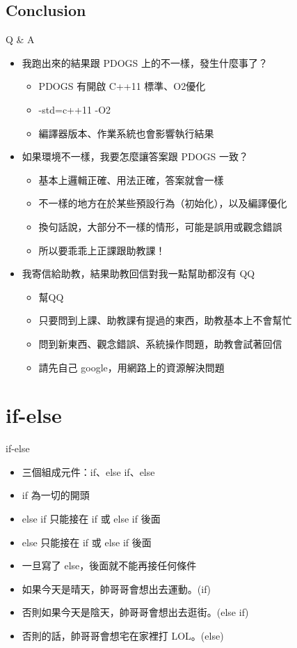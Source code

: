 \documentclass[t]{beamer}
\begin{document}
\subsection{Conclusion}
\begin{frame}{Q \& A}
  \begin{itemize}
    \item 我跑出來的結果跟 PDOGS 上的不一樣，發生什麼事了？
      \begin{itemize}
        \item PDOGS 有開啟 C++11 標準、O2優化
        \item -std=c++11 -O2
        \item 編譯器版本、作業系統也會影響執行結果
      \end{itemize}
    \item 如果環境不一樣，我要怎麼讓答案跟 PDOGS 一致？
      \begin{itemize}
        \item 基本上邏輯正確、用法正確，答案就會一樣
        \item 不一樣的地方在於某些預設行為（初始化），以及編譯優化
        \item 換句話說，大部分不一樣的情形，可能是誤用或觀念錯誤
        \item 所以要乖乖上正課跟助教課！
      \end{itemize}
    \item 我寄信給助教，結果助教回信對我一點幫助都沒有 QQ
      \begin{itemize}
        \item 幫QQ
        \item 只要問到上課、助教課有提過的東西，助教基本上不會幫忙
        \item 問到新東西、觀念錯誤、系統操作問題，助教會試著回信
        \item 請先自己 google，用網路上的資源解決問題
      \end{itemize}
  \end{itemize}
\end{frame}

\section{if-else}
\begin{frame}{if-else}
  \begin{itemize}
    \item 三個組成元件：if、else if、else
    \item if 為一切的開頭
    \item else if 只能接在 if 或 else if 後面
    \item else 只能接在 if 或 else if 後面
    \item 一旦寫了 else，後面就不能再接任何條件
  \end{itemize}
  \begin{itemize}
    \item 如果今天是晴天，帥哥哥會想出去運動。(if)
    \item 否則如果今天是陰天，帥哥哥會想出去逛街。(else if)
    \item 否則的話，帥哥哥會想宅在家裡打 LOL。(else)
  \end{itemize}
\end{frame}
\end{document}
